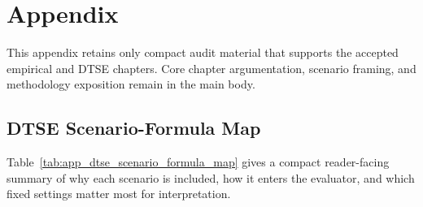 \section{Appendix}
\label{sec:appendix}

\noindent This appendix retains only compact audit material that supports the accepted empirical and DTSE chapters. Core chapter argumentation, scenario framing, and methodology exposition remain in the main body.

\subsection{DTSE Scenario-Formula Map}
\label{app:dtse_scenario_formula_map}
Table~\ref{tab:app_dtse_scenario_formula_map} gives a compact reader-facing summary of why each scenario is included, how it enters the evaluator, and which fixed settings matter most for interpretation.


